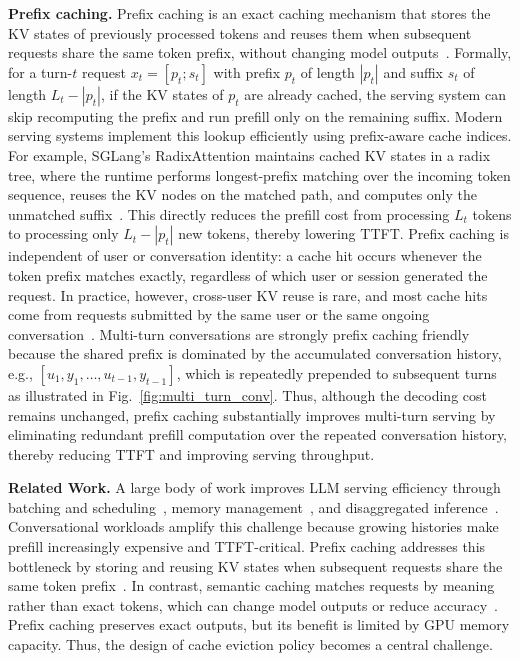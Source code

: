 \documentclass{article}
\newcommand{\bo}[1]{\textcolor{red}{[Bo: #1]}}
\begin{document}
\textbf{Prefix caching.}
Prefix caching is an exact caching mechanism that stores the KV states of previously processed tokens and reuses them when subsequent requests share the same token prefix, without changing model outputs~\cite{MLSYS2024_a66caa17,openai_prompt_cache,298501}. Formally, for a turn-$t$ request $x_t=[p_t;s_t]$ with prefix $p_t$ of length $|p_t|$ and suffix $s_t$ of length $L_t-|p_t|$, if the KV states of $p_t$ are already cached, the serving system can skip recomputing the prefix and run prefill only on the remaining suffix. Modern serving systems implement this lookup efficiently using prefix-aware cache indices. For example, SGLang's RadixAttention maintains cached KV states in a radix tree, where the runtime performs longest-prefix matching over the incoming token sequence, reuses the KV nodes on the matched path, and computes only the unmatched suffix~\cite{sglang}. This directly reduces the prefill cost from processing $L_t$ tokens to processing only $L_t-|p_t|$ new tokens, thereby lowering TTFT. Prefix caching is independent of user or conversation identity: a cache hit occurs whenever the token prefix matches exactly, regardless of which user or session generated the request. In practice, however, cross-user KV reuse is rare, and most cache hits come from requests submitted by the same user or the same ongoing conversation~\cite{wang2025kvcache}. Multi-turn conversations are strongly prefix caching friendly because the shared prefix is dominated by the accumulated conversation history, e.g., $[u_1,y_1,\ldots,u_{t-1},y_{t-1}]$, which is repeatedly prepended to subsequent turns as illustrated in Fig.~\ref{fig:multi_turn_conv}. Thus, although the decoding cost remains unchanged, prefix caching substantially improves multi-turn serving by eliminating redundant prefill computation over the repeated conversation history, thereby reducing TTFT and improving serving throughput.

\textbf{Related Work.
}
A large body of work improves LLM serving efficiency through batching and scheduling~\cite{ocra, agrawal2024taming, hotprefix}, memory management~\cite{vllm}, and disaggregated inference~\cite{zhong2024distserve, patel2024splitwise}. Conversational workloads amplify this challenge because growing histories make prefill increasingly expensive and TTFT-critical. Prefix caching addresses this bottleneck by storing and reusing KV states when subsequent requests share the same token prefix~\cite{sglang, openai_prompt_cache, dexter2025llm}. In contrast, semantic caching matches requests by meaning rather than exact tokens, which can change model outputs or reduce accuracy~\cite{bang-2023-gptcache, gill2025meancache, liu2025semantic}. Prefix caching preserves exact outputs, but its benefit is limited by GPU memory capacity. Thus, the design of cache eviction policy becomes a central challenge.
\end{document}
